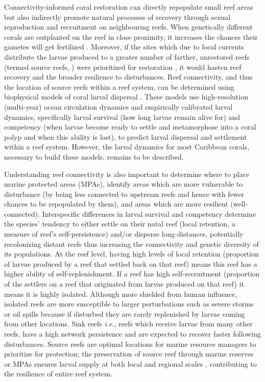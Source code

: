 \documentclass[preprint,12pt,authoryear]{elsarticle}
\begin{document}
Connectivity-informed coral restoration can directly repopulate small reef areas but also indirectly promote natural processes of recovery through sexual reproduction and recruitment on neighbouring reefs. When genetically different corals are outplanted on the reef in close proximity, it increases the chances their gametes will get fertilized \citep{omori2019coral}. Moreover, if the sites which due to local currents distribute the larvae produced to a greater number of farther, unrestored reefs (termed source reefs, \citealp{bode2018resilient}) were prioritized for restoration \citep{king2023larval}, it would hasten reef recovery and the broader resilience to disturbances. Reef connectivity, and thus the location of source reefs within a reef system, can be determined using biophysical models of coral larval dispersal \citep{frys2020fine, figueiredo2022global,king2023larval}. These models use high-resolution (multi-year) ocean circulation dynamics and empirically calibrated larval dynamics, specifically larval survival (how long larvae remain alive for) and competency (when larvae become ready to settle and metamorphose into a coral polyp and when this ability is lost), to predict larval dispersal and settlement within a reef system. However, the larval dynamics for most Caribbean corals, necessary to build these models, remains to be described.

Understanding reef connectivity is also important to determine where to place marine protected areas (MPAs), identify areas which are more vulnerable to disturbance (by being less connected to upstream reefs and hence with fewer chances to be repopulated by them), and areas which are more resilient (well-connected). Interspecific differences in larval survival and competency determine the species’ tendency to either settle on their natal reef (local retention, a measure of reef’s self-persistence) and/or disperse long-distances, potentially recolonizing distant reefs thus increasing the connectivity and genetic diversity of its populations. At the reef level, having high levels of local retention (proportion of larvae produced by a reef that settled back on that reef) means this reef has a higher ability of self-replenishment. If a reef has high self-recruitment (proportion of the settlers on a reef that originated from larvae produced on that reef) it means it is highly isolated.  Although more shielded from human influence, isolated reefs are more susceptible to larger perturbations such as severe storms or oil spills \citep{baumann2022remoteness} because if disturbed they are rarely replenished by larvae coming from other locations. Sink reefs \textit{i.e.}, reefs which receive larvae from many other reefs, have a high network persistence and are expected to recover faster following disturbances. Source reefs are optimal locations for marine resource managers to prioritize for protection; the preservation of source reef through marine reserves or MPAs ensures larval supply at both local and regional scales \citep{muenzel2023integrating}, contributing to the resilience of entire reef system.
\end{document}
